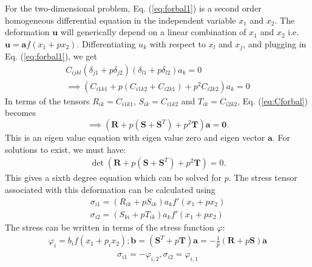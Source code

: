 \documentclass[%
reprint,
 amsmath,amssymb,
 aps,
 prb,
]{revtex4-1}
\newcommand*{\rtten}[1]{\mathbf{\boldsymbol{#1}}}
\newcommand*{\rtvec}[1]{\mathbf{#1}}
\begin{document}
For the two-dimensional problem, Eq. (\ref{eq:forbal1}) is a second order homogeneous differential equation in the independent variable $x_1$ and $x_2$. The deformation $\rtvec{u}$ will generically depend on a linear combination of $x_1$ and $x_2$ i.e. $\rtvec{u}=\rtvec{a} f(x_1+px_2)$. Differentiating $u_k$ with respect to $x_l$ and $x_j$, and plugging in Eq. (\ref{eq:forbal1}), we get
\begin{eqnarray}
C_{ijkl}(\delta_{j1}+p\delta_{j2})(\delta_{l1}+p\delta_{l2})a_k=0\\
\implies \left(C_{i1k1}+p(C_{i1k2}+C_{i2k1})+p^2C_{i2k2}\right)a_k=0\label{eq:Cforbal}
\end{eqnarray} 
In terms of the tensors $R_{ik}=C_{i1k1}$, $S_{ik}=C_{i1k2}$ and $T_{ik}=C_{i2k2}$, Eq. (\ref{eq:Cforbal}) becomes
\begin{equation}\label{eq:Qforbal}
\implies \left( \rtten{R}+p(\rtten{S}+\rtten{S}^T)+p^2\rtten{T} \right)\rtvec{a}=\rtvec{0}.
\end{equation}
This is an eigen value equation with eigen value zero and eigen vector $\rtvec{a}$. For solutions to exist, we must have:
\begin{eqnarray}\label{eq:degree6}
\det(\rtten{R}+p(\rtten{S}+\rtten{S}^T)+p^2\rtten{T} )=0.
\end{eqnarray}
This gives a sixth degree equation which can be solved for $p$. The stress tensor associated with this deformation can be calculated using
\begin{subequations}
\begin{eqnarray}
\sigma_{i1}=(R_{ik}+pS_{ik})a_kf'(x_1+px_2)\\
\sigma_{i2}=(S_{ki}+pT_{ik})a_kf'(x_1+px_2)
\end{eqnarray}
\end{subequations}
The stress can be written in terms of the stress function $\varphi$:
\begin{eqnarray*}
\varphi_i=b_i f(x_1+p_ix_2); \rtvec{b}=(\rtten{S}^T+p\rtten{T})\rtvec{a}=-\frac{1}{p}(\rtten{R}+p\rtten{S})\rtvec{a}\\
\end{eqnarray*}
\begin{equation}
\sigma_{i1}=-\varphi_{i,2}, \sigma_{i2}=\varphi_{i,1}
\end{equation}
\end{document}

